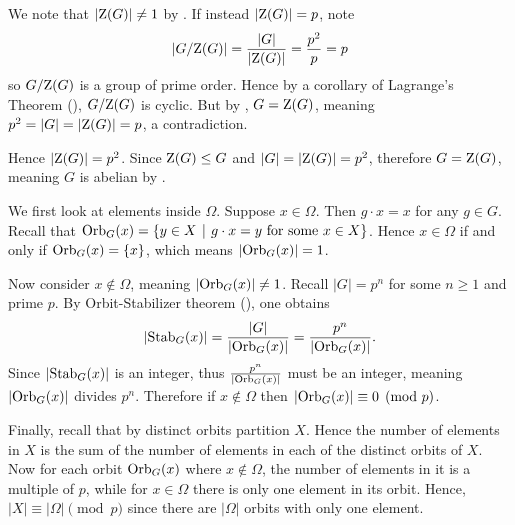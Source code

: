\begin{questions}
    We note that $|\mathrm{Z}(G)| \neq 1$ by . If instead $|\mathrm{Z}(G)| = p$, note
    \[
        |G/\mathrm{Z}(G)| = \frac{|G|}{|\mathrm{Z}(G)|} = \frac{p^2}{p} = p
    \]
    so $G/\mathrm{Z}(G)$ is a group of prime order. Hence by a corollary of Lagrange's Theorem (), $G/\mathrm{Z}(G)$ is cyclic. But by , $G = \mathrm{Z}(G)$, meaning $p^2 = |G| = |\mathrm{Z}(G)| = p$, a contradiction.

    Hence $|\mathrm{Z}(G)| = p^2$. Since $\mathrm{Z}(G) \leq G$ and $|G| = |\mathrm{Z}(G)| = p^2$, therefore $G = \mathrm{Z}(G)$, meaning $G$ is abelian by .

    \item We first look at elements inside $\Omega$. Suppose $x \in \Omega$. Then $g \cdot x = x$ for any $g \in G$. Recall that $\Orb{G}{x} = \{y \in X \vert g \cdot x = y \text{ for some } x \in X\}$. Hence $x \in \Omega$ if and only if $\mathrm{Orb}_{G}(x) = \{x\}$, which means $|\mathrm{Orb}_{G}(x)| = 1$.

    Now consider $x \notin \Omega$, meaning $|\mathrm{Orb}_{G}(x)| \neq 1$. Recall $|G| = p^n$ for some $n \geq 1$ and prime $p$. By Orbit-Stabilizer theorem (), one obtains
    \[
        |\mathrm{Stab}_{G}(x)| = \frac{|G|}{|\mathrm{Orb}_{G}(x)|} = \frac{p^n}{|\mathrm{Orb}_{G}(x)|}.
    \]
    Since $|\mathrm{Stab}_{G}(x)|$ is an integer, thus $\frac{p^n}{|\mathrm{Orb}_{G}(x)|}$ must be an integer, meaning $|\mathrm{Orb}_{G}(x)|$ divides $p^n$. Therefore if $x \notin \Omega$ then $|\mathrm{Orb}_{G}(x)| \equiv 0 \pmod p$.

    Finally, recall that by  distinct orbits partition $X$. Hence the number of elements in $X$ is the sum of the number of elements in each of the distinct orbits of $X$. Now for each orbit $\mathrm{Orb}_{G}(x)$ where $x \notin \Omega$, the number of elements in it is a multiple of $p$, while for $x \in \Omega$ there is only one element in its orbit. Hence, $|X| \equiv |\Omega| \pmod p$ since there are $|\Omega|$ orbits with only one element.
\end{questions}
